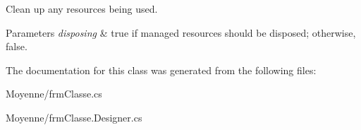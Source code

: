 Clean up any resources being used. 


\begin{DoxyParams}{Parameters}
{\em disposing} & true if managed resources should be disposed; otherwise, false.\\
\hline
\end{DoxyParams}


The documentation for this class was generated from the following files\+:\begin{DoxyCompactItemize}
\item 
Moyenne/frm\+Classe.\+cs\item 
Moyenne/frm\+Classe.\+Designer.\+cs\end{DoxyCompactItemize}
